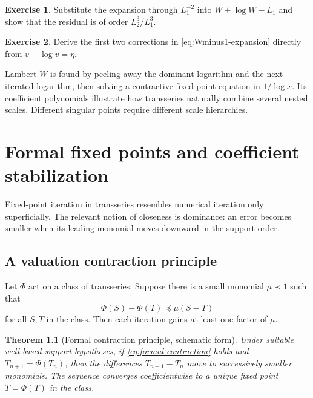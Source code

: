 \documentclass[11pt,openany]{book}
\theoremstyle{definition}
\newtheorem{exercise}{Exercise}[chapter]
\theoremstyle{plain}
\newtheorem{theorem}{Theorem}[chapter]
\theoremstyle{remark}
\newcommand{\precdom}{\prec}
\newcommand{\preceqdom}{\preccurlyeq}
\begin{document}
\begin{exercise}
Substitute the expansion through $L_1^{-2}$ into $W+\log W-L_1$ and show that the residual is of order $L_2^3/L_1^3$.
\end{exercise}

\begin{exercise}
Derive the first two corrections in \cref{eq:Wminus1-expansion} directly from $v-\log v=\eta$.
\end{exercise}

\begin{summarybox}
Lambert $W$ is found by peeling away the dominant logarithm and the next iterated logarithm, then solving a contractive fixed-point equation in $1/\log x$. Its coefficient polynomials illustrate how transseries naturally combine several nested scales. Different singular points require different scale hierarchies.
\end{summarybox}


\chapter{Formal fixed points and coefficient stabilization}\label{ch:fixed-points}

Fixed-point iteration in transseries resembles numerical iteration only superficially. The relevant notion of closeness is dominance: an error becomes smaller when its leading monomial moves downward in the support order.

\section{A valuation contraction principle}

Let $\Phi$ act on a class of transseries. Suppose there is a small monomial $\mu\precdom1$ such that
\begin{equation}\label{eq:formal-contraction}
 \Phi(S)-\Phi(T)\preceqdom \mu(S-T)
\end{equation}
for all $S,T$ in the class. Then each iteration gains at least one factor of $\mu$.

\begin{theorem}[Formal contraction principle, schematic form]\label{thm:formal-contraction}
Under suitable well-based support hypotheses, if \cref{eq:formal-contraction} holds and $T_{n+1}=\Phi(T_n)$, then the differences $T_{n+1}-T_n$ move to successively smaller monomials. The sequence converges coefficientwise to a unique fixed point $T=\Phi(T)$ in the class.
\end{theorem}
\end{document}
